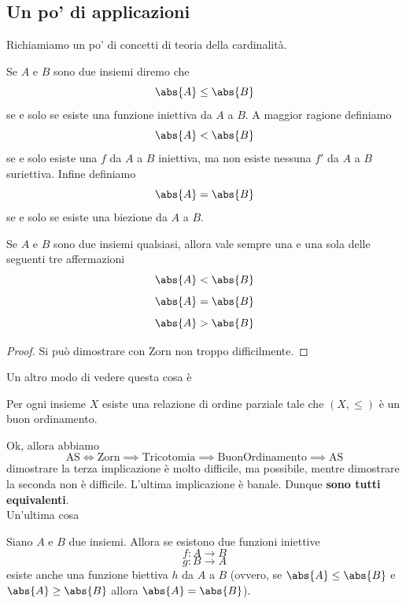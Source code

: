 \documentclass[11pt]{scrartcl}
\begin{document}
  \subsection{Un po' di applicazioni}
  Richiamiamo un po' di concetti di teoria della cardinalità.
  \begin{definition}
  	Se $A$ e $B$ sono due insiemi diremo che 
  	$$\abs{A}\le \abs{B}$$
  	se e solo se esiste una funzione iniettiva da $A$ a $B$. A maggior ragione definiamo 
  	$$\abs{A}<\abs{B}$$
  	se e solo esiste una $f$ da $A$ a $B$ iniettiva, ma non esiste nessuna $f'$ da $A$ a $B$ suriettiva. Infine definiamo 
  	$$\abs{A}=\abs{B}$$
  	se e solo se esiste una biezione da $A$ a $B$.
  \end{definition}
  \begin{theorem}
  	Se $A$ e $B$ sono due insiemi qualsiasi, allora vale sempre una e una sola delle seguenti tre affermazioni
  	$$\abs{A}<\abs{B}$$
  	$$\abs{A}=\abs{B}$$
  	$$\abs{A}>\abs{B}$$
  \end{theorem}
  \begin{proof}
  	Si può dimostrare con Zorn non troppo difficilmente.
  \end{proof}
  Un altro modo di vedere questa cosa è
  \begin{theorem}
  	Per ogni insieme $X$ esiste una relazione di ordine parziale tale che $(X,\le)$ è un buon ordinamento.
  \end{theorem}
  Ok, allora abbiamo
  $$\text{AS}\iff \text{Zorn} \implies \text{Tricotomia} \implies \text{BuonOrdinamento} \implies \text{AS}$$
  dimostrare la terza implicazione è molto difficile, ma possibile, mentre dimostrare la seconda non è difficile. L'ultima implicazione è banale. Dunque \textbf{sono tutti equivalenti}. \\
  Un'ultima cosa
  \begin{theorem}
  	Siano $A$ e $B$ due insiemi. Allora se esistono due funzioni iniettive 
  	$$f:A\to B$$
  	$$g:B\to A$$
  	esiste anche una funzione biettiva $h$ da $A$ a $B$ (ovvero, se $\abs{A}\le \abs{B}$ e $\abs{A}\ge \abs{B}$ allora $\abs{A}=\abs{B}$).
  \end{theorem}
\end{document}

